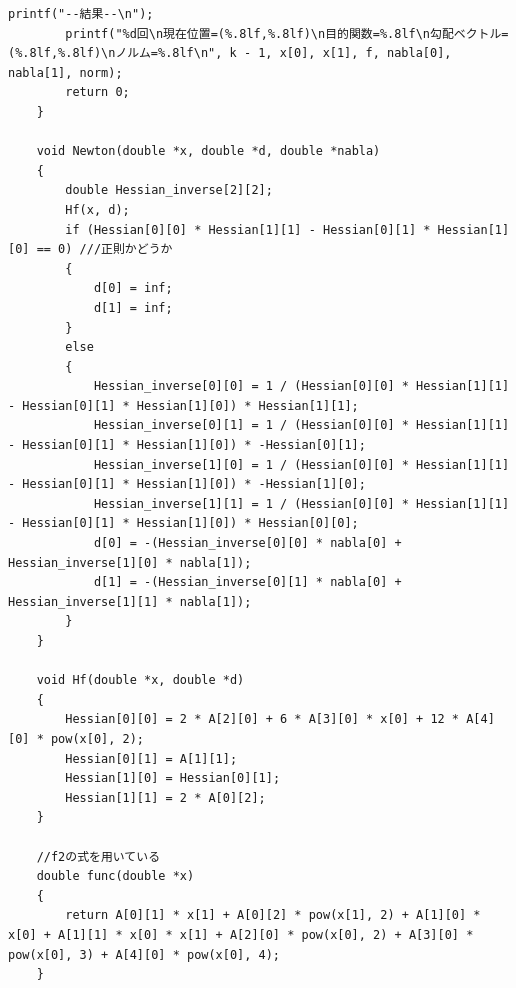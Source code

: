 \documentclass[12pt]{jarticle}
\begin{document}
\begin{lstlisting}[style = lstcpp,caption=4619055\_辰川力駆\_newton\_2.c]
        printf("--結果--\n");
        printf("%d回\n現在位置=(%.8lf,%.8lf)\n目的関数=%.8lf\n勾配ベクトル=(%.8lf,%.8lf)\nノルム=%.8lf\n", k - 1, x[0], x[1], f, nabla[0], nabla[1], norm);
        return 0;
    }
    
    void Newton(double *x, double *d, double *nabla)
    {
        double Hessian_inverse[2][2];
        Hf(x, d);
        if (Hessian[0][0] * Hessian[1][1] - Hessian[0][1] * Hessian[1][0] == 0) ///正則かどうか
        {
            d[0] = inf;
            d[1] = inf;
        }
        else
        {
            Hessian_inverse[0][0] = 1 / (Hessian[0][0] * Hessian[1][1] - Hessian[0][1] * Hessian[1][0]) * Hessian[1][1];
            Hessian_inverse[0][1] = 1 / (Hessian[0][0] * Hessian[1][1] - Hessian[0][1] * Hessian[1][0]) * -Hessian[0][1];
            Hessian_inverse[1][0] = 1 / (Hessian[0][0] * Hessian[1][1] - Hessian[0][1] * Hessian[1][0]) * -Hessian[1][0];
            Hessian_inverse[1][1] = 1 / (Hessian[0][0] * Hessian[1][1] - Hessian[0][1] * Hessian[1][0]) * Hessian[0][0];
            d[0] = -(Hessian_inverse[0][0] * nabla[0] + Hessian_inverse[1][0] * nabla[1]);
            d[1] = -(Hessian_inverse[0][1] * nabla[0] + Hessian_inverse[1][1] * nabla[1]);
        }
    }
    
    void Hf(double *x, double *d)
    {
        Hessian[0][0] = 2 * A[2][0] + 6 * A[3][0] * x[0] + 12 * A[4][0] * pow(x[0], 2);
        Hessian[0][1] = A[1][1];
        Hessian[1][0] = Hessian[0][1];
        Hessian[1][1] = 2 * A[0][2];
    }
    
    //f2の式を用いている
    double func(double *x)
    {
        return A[0][1] * x[1] + A[0][2] * pow(x[1], 2) + A[1][0] * x[0] + A[1][1] * x[0] * x[1] + A[2][0] * pow(x[0], 2) + A[3][0] * pow(x[0], 3) + A[4][0] * pow(x[0], 4);
    }
\end{lstlisting}

\end{document}
